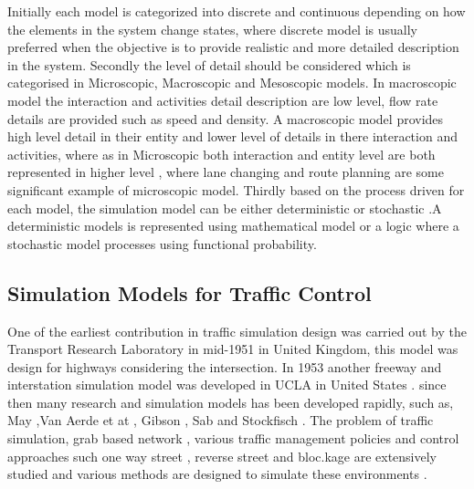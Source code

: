 Initially each model is categorized into discrete and continuous depending on how the elements in the system change states, where discrete model is usually preferred   when the objective is to provide realistic and more detailed description in the system.  Secondly the level of detail should be considered which is categorised in Microscopic, Macroscopic and Mesoscopic models. In macroscopic model the interaction and activities detail description are low level, flow rate details are provided such as speed and density. A macroscopic model provides high level detail in their entity and lower level of details in there interaction and activities, where as in Microscopic both interaction and entity level are both represented in higher level , where lane changing and route planning are some significant example of microscopic model. Thirdly based on the process driven for each model, the simulation model can be either deterministic or stochastic .A deterministic models is represented using mathematical model or a logic where a stochastic model processes using functional probability.  

\subsection{Simulation Models for Traffic Control}
 One of the earliest contribution in traffic simulation design was carried out by the Transport Research Laboratory in mid-1951 in United Kingdom, this model was design for highways considering the intersection.  In 1953 another freeway and interstation simulation model was developed in UCLA in United States \cite{mayad}. since then many research and simulation models has been developed rapidly,  such as, May \cite{mayad2},Van Aerde et at \cite{mayad}, Gibson \cite{mayad}, Sab and Stockfisch \cite{sabra}. The problem of traffic simulation, grab based network , various traffic management policies and control approaches such one way street , reverse street and  bloc.kage are extensively studied and various methods are designed to simulate these environments .
 
